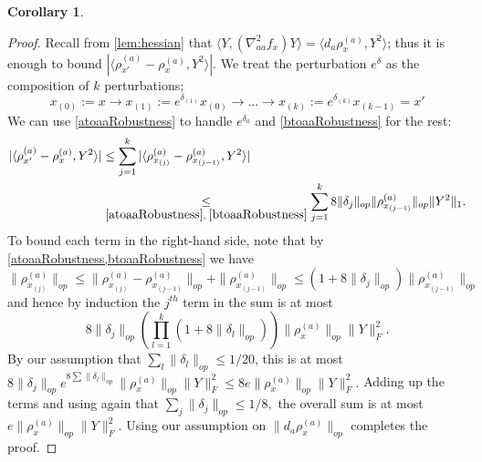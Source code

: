 \documentclass[aos]{imsart}
\newtheorem{corollary}[theorem]{Corollary}
\theoremstyle{definition}
\numberwithin{equation}{section}
\newcommand{\samp}{x}
\newcommand{\CF}[1]{{\color{purple}[CF: #1]}}
\begin{document}
\begin{appendix}
\begin{corollary}
\end{corollary}
\begin{proof}
Recall from \cref{lem:hessian} that $\langle Y, (\nabla^{2}_{aa} f_{\samp}) Y \rangle = \langle d_{a} \rho_{\samp}^{(a)}, Y^{2} \rangle$; thus it is enough to bound $|\langle \rho_{\samp'}^{(a)} - \rho_{\samp}^{(a)}, Y^{2} \rangle|$. We treat the perturbation $e^\delta$ as the composition of $k$ perturbations;
\[ \samp_{(0)}:=\samp \to \samp_{(1)}:= e^{\delta_{(1)}} \samp_{(0)} \to ... \to \samp_{(k)}:=e^{\delta_{(k)}} \samp_{(k-1)} = \samp'  \]
We can use \cref{atoaaRobustness} to handle $e^{\delta_{a}}$ and \cref{btoaaRobustness} for the rest:
\begin{align*}
 |\langle \rho_{\samp'}^{(a)} - \rho_{\samp}^{(a)}, Y^{2} \rangle|
 &\leq \sum_{j=1}^{k} |\langle \rho_{\samp_{(j)}}^{(a)} - \rho_{\samp_{(j-1)}}^{(a)}, Y^{2} \rangle| \\
 &\underset{\cref{atoaaRobustness},\;\cref{btoaaRobustness}}{\leq} \sum_{j=1}^{k}  8 \|\delta_{j}\|_{op} \|\rho_{\samp_{(j-1)}}^{(a)}\|_{op} \|Y^{2}\|_{1}.
\end{align*}
To bound each term in the right-hand side, note that by \cref{atoaaRobustness,btoaaRobustness} we have 
$$\|\rho_{\samp_{(j)}}^{(a)}\|_{op} \leq \|\rho_{\samp_{(j)}}^{(a)} - \rho_{\samp_{(j-1)}}^{(a)}\|_{op} + \|\rho_{\samp_{(j-1)}}^{(a)}\|_{op} \leq   (1+8 \|\delta_{j}\|_{op})\|\rho_{\samp_{(j-1)}}^{(a)}\|_{op}$$
and hence by induction the $j^{th}$ term in the sum is at most $$8 \|\delta_j\|_{op} \left( \prod_{l=1}^k (1+8 \|\delta_{l}\|_{op}) \right) \|\rho_{\samp}^{(a)}\|_{op} \|Y\|_{F}^{2}.$$ By our assumption that $\sum_l \|\delta_l\|_{op} \leq 1/20$, this is at most $8 \|\delta_j\|_{op} e^{8 \sum \|\delta_l\|_{op}} \|\rho_{\samp}^{(a)}\|_{op} \|Y\|_{F}^{2} \leq 8 e \|\rho_{\samp}^{(a)}\|_{op} \|Y\|_{F}^{2}. $ Adding up the terms and using again that $\sum_j \|\delta_j\|_{op} \leq 1/8,$ the overall sum is at most $e \|\rho_{\samp}^{(a)}\|_{op} \|Y\|_{F}^{2}$. Using our assumption on $\|d_{a} \rho_{\samp}^{(a)}\|_{op}$ completes the proof.
\end{proof}


\end{appendix}
\end{document}
